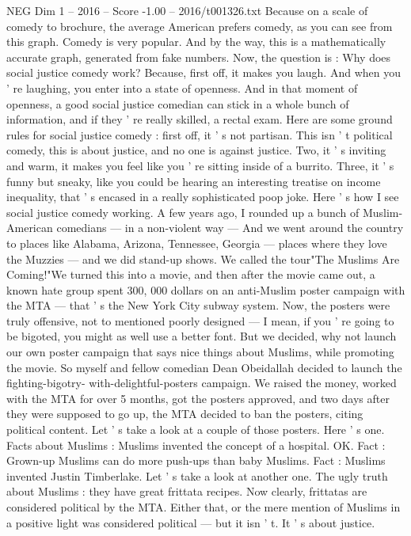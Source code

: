 \begin{textsample}{NEG Dim 1 – 2016 – Score -1.00 – 2016/t001326.txt}
Because on a scale of comedy to brochure, the average American prefers comedy, as you can see from this graph.
Comedy is very popular.
And by the way, this is a mathematically accurate graph, generated from fake numbers.
Now, the question is : Why does social justice comedy work?
Because, first off, it makes you laugh.
And when you ' re laughing, you enter into a state of openness.
And in that moment of openness, a good social justice comedian can stick in a whole bunch of information, and if they ' re really skilled, a rectal exam.
Here are some ground rules for social justice comedy : first off, it ' s not partisan.
This isn ' t political comedy, this is about justice, and no one is against justice.
Two, it ' s inviting and warm, it makes you feel like you ' re sitting inside of a burrito.
Three, it ' s funny but sneaky, like you could be hearing an interesting treatise on income inequality, that ' s encased in a really sophisticated poop joke.
Here ' s how I see social justice comedy working.
A few years ago, I rounded up a bunch of Muslim-American comedians — in a non-violent way — And we went around the country to places like Alabama, Arizona, Tennessee, Georgia — places where they love the Muzzies — and we did stand-up shows.
We called the tour"The Muslims Are Coming!"We turned this into a movie, and then after the movie came out, a known hate group spent 300, 000 dollars on an anti-Muslim poster campaign with the MTA — that ' s the New York City subway system.
Now, the posters were truly offensive, not to mentioned poorly designed — I mean, if you ' re going to be bigoted, you might as well use a better font.
But we decided, why not launch our own poster campaign that says nice things about Muslims, while promoting the movie.
So myself and fellow comedian Dean Obeidallah decided to launch the fighting-bigotry- with-delightful-posters campaign.
We raised the money, worked with the MTA for over 5 months, got the posters approved, and two days after they were supposed to go up, the MTA decided to ban the posters, citing political content.
Let ' s take a look at a couple of those posters.
Here ' s one.
Facts about Muslims : Muslims invented the concept of a hospital.
OK.
Fact : Grown-up Muslims can do more push-ups than baby Muslims.
Fact : Muslims invented Justin Timberlake.
Let ' s take a look at another one.
The ugly truth about Muslims : they have great frittata recipes.
Now clearly, frittatas are considered political by the MTA.
Either that, or the mere mention of Muslims in a positive light was considered political — but it isn ' t.
It ' s about justice.

\end{textsample}
